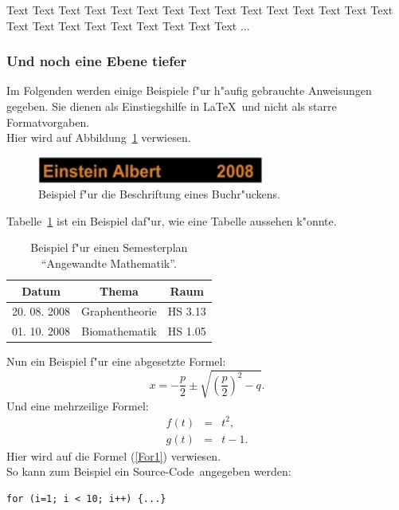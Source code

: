 \documentclass[a4paper,bibtotoc,oneside]{scrbook}
\begin{document}
Text Text Text Text Text Text Text Text Text Text Text Text Text Text Text Text Text Text Text Text Text Text Text Text ...

\subsubsection[Erster Unter-Unterabschnitt]{Und noch eine Ebene tiefer} 

Im Folgenden werden einige Beispiele f"ur h"aufig gebrauchte Anweisungen gegeben. Sie dienen als Einstiegshilfe in \LaTeX\ und 
nicht als starre Formatvorgaben.  
\\[2\baselineskip]
Hier wird auf Abbildung~\ref{Abb1} verwiesen. 
\begin{figure}[htbp]
\centering
\includegraphics[width=75mm]{Buchruecken}
\caption[Beschriftung eines Buchr"uckens.]{Beispiel f"ur die Beschriftung eines Buchr"uckens.}\label{Abb1}
\end{figure}
Tabelle~\ref{Tab1} ist ein Beispiel daf"ur, wie eine Tabelle aussehen k"onnte.
\begin{table}[htbp]
\centering
\begin{tabular}{ | c | c | c | }\hline
{\bf Datum} & {\bf Thema} & {\bf Raum}\\ \hline
\hline
20. 08. 2008 & Graphentheorie & HS 3.13\\ \hline
01. 10. 2008 & Biomathematik & HS 1.05\\ \hline
\end{tabular}
\caption[Semesterplan "`Angewandte Mathematik"'.]{Beispiel f"ur einen Semesterplan "`Angewandte Mathematik"'.}\label{Tab1}
\end{table}

\noindent
Nun ein Beispiel f"ur eine abgesetzte Formel:
\begin{equation}
x =  - \frac{p}{2} \pm \sqrt{\left(\frac{p}{2}\right)^2 - q}.
\end{equation}
Und eine mehrzeilige Formel:
\begin{eqnarray}
f(t)&=& t^2 \label{For1},\\
g(t) &=& t-1.
\end{eqnarray}
Hier wird auf die Formel (\ref{For1}) verwiesen. \\

\noindent
So kann zum Beispiel ein \glqq Source-Code\grqq\  angegeben werden: 
\begin{verbatim}
for (i=1; i < 10; i++) {...} 
\end{verbatim}
\end{document}
